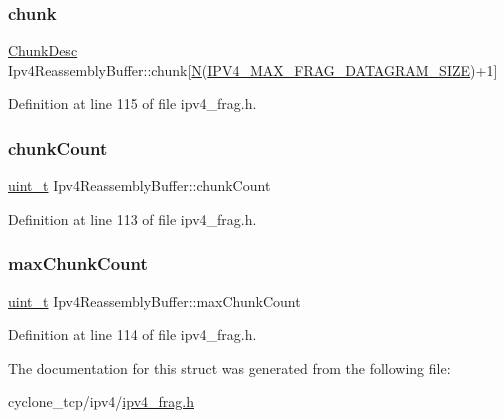 \subsubsection{\texorpdfstring{chunk}{chunk}}
{\footnotesize\ttfamily \hyperlink{structChunkDesc}{Chunk\+Desc} Ipv4\+Reassembly\+Buffer\+::chunk\mbox{[}\hyperlink{net__mem_8h_a5d7f6248b8dd365190e7562d4e14a4f3}{N}(\hyperlink{net__config_8h_a3f9a052384f25fdf9c6f5c32cb32e9ce}{I\+P\+V4\+\_\+\+M\+A\+X\+\_\+\+F\+R\+A\+G\+\_\+\+D\+A\+T\+A\+G\+R\+A\+M\+\_\+\+S\+I\+ZE})+1\mbox{]}}



Definition at line 115 of file ipv4\+\_\+frag.\+h.

\mbox{\label{structIpv4ReassemblyBuffer_a4a9c06b42f872f493fbc5bc39fc0b6d7}} 
\subsubsection{\texorpdfstring{chunk\+Count}{chunkCount}}
{\footnotesize\ttfamily \hyperlink{compiler__port_8h_a12a1e9b3ce141648783a82445d02b58d}{uint\+\_\+t} Ipv4\+Reassembly\+Buffer\+::chunk\+Count}



Definition at line 113 of file ipv4\+\_\+frag.\+h.

\mbox{\label{structIpv4ReassemblyBuffer_ae12403b25f09034a743e45debe206c69}} 
\subsubsection{\texorpdfstring{max\+Chunk\+Count}{maxChunkCount}}
{\footnotesize\ttfamily \hyperlink{compiler__port_8h_a12a1e9b3ce141648783a82445d02b58d}{uint\+\_\+t} Ipv4\+Reassembly\+Buffer\+::max\+Chunk\+Count}



Definition at line 114 of file ipv4\+\_\+frag.\+h.



The documentation for this struct was generated from the following file\+:\begin{DoxyCompactItemize}
\item 
cyclone\+\_\+tcp/ipv4/\hyperlink{ipv4__frag_8h}{ipv4\+\_\+frag.\+h}\end{DoxyCompactItemize}
